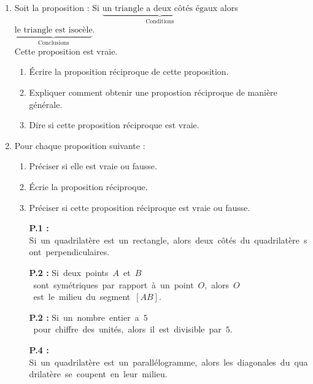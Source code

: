 \begin{activite}
    \begin{enumerate}
        \item Soit la proposition : \og Si $\underbrace{\text{un triangle a deux côtés égaux}}_{\text{Conditions}}$ alors $\underbrace{\text{le triangle est isocèle}}_{\text{Conclusions}}$.\fg \\
        Cette proposition est vraie.
        \begin{enumerate}
            \item Écrire la proposition réciproque de cette proposition.
            \item Expliquer comment obtenir une propostion réciproque de manière générale.
            \item Dire si cette proposition réciproque est vraie.
        \end{enumerate}
        \item Pour chaque proposition suivante :
        \begin{enumerate}
            \item Préciser si elle est vraie ou fausse.
            \item Écrie la proposition réciproque.
            \item Préciser si cette proposition réciproque est vraie ou fausse.
        \end{enumerate}
        \begin{itemize}
            \item[{\bfseries P.1 : }]\mbox{Si un quadrilatère est un rectangle, alors deux côtés du quadrilatère sont perpendiculaires.}
            \item[{\bfseries P.2 : }]\mbox{Si deux points $A$ et $B$ sont symétriques par rapport à un point $O$, alors $O$ est le milieu du segment $[AB]$.}
            \item[{\bfseries P.2 : }]\mbox{Si un nombre entier a $5$ pour chiffre des unités, alors il est divisible par $5$.}
            \item[{\bfseries P.4 : }]\mbox{Si un quadrilatère est un parallélogramme, alors les diagonales du quadrilatère se coupent en leur milieu.}
        \end{itemize}
    \end{enumerate}
\end{activite}